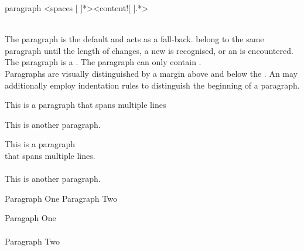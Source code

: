 \begin{identifier}{paragraph}
<spaces [ ]*><content![ ].*>
\end{identifier}
 \\

The paragraph is the default  and acts as a fall-back.  belong to the same paragraph until the length of  changes, a new  is recognised, or an  is encountered. The paragraph is a . The paragraph  can only contain . \\

Paragraphs are visually distinguished by a margin above and below the . An  may additionally employ indentation rules to distinguish the beginning of a paragraph. \\

\begin{examples}
  \begin{examplesource}
This is a paragraph
that spans multiple lines

This is another paragraph.
  \end{examplesource}
  \begin{exampleoutput}
    This is a paragraph\\
    that spans multiple lines.\\
    \\
    This is another paragraph.
  \end{exampleoutput}
  \begin{examplesource}
Paragraph One
  Paragraph Two
  \end{examplesource}
  \begin{exampleoutput}
    Paragaph One\\
    \\
    Paragraph Two
  \end{exampleoutput}
\end{examples}

